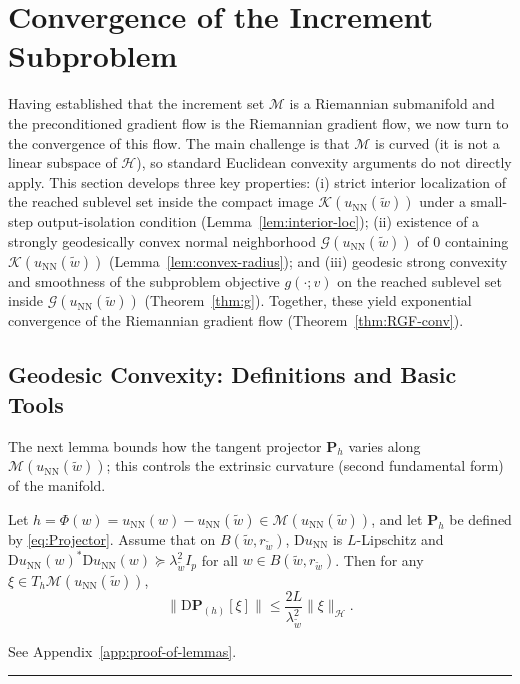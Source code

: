 \documentclass[twoside,11pt]{article}
\newcommand{\BlackBoxProof}{\rule{1.5ex}{1.5ex}}
\renewenvironment{proof}{\par\noindent{\bf Proof\ }}{\hfill\BlackBoxProof\par\medskip}
\newcommand{\rev}[1]{#1}                           %
\renewcommand{\P}{\mathbf{P}}
\newcommand{\D}{\mathrm{D}}
\newcommand{\NN}{\mathrm{NN}}
\newcommand{\calG}{\mathcal{G}}
\newcommand{\calH}{\mathcal{H}}
\newcommand{\calK}{\mathcal{K}}
\newcommand{\calM}{\mathcal{M}}
\begin{document}
\section{Convergence of the Increment Subproblem}\label{sec:conv}
\rev{%
Having established that the increment set $\calM$ is a Riemannian submanifold and the
preconditioned gradient flow is the Riemannian gradient flow, we now turn to the convergence
of this flow. The main challenge is that $\calM$ is curved (it is not a linear subspace of $\calH$),
so standard Euclidean convexity arguments do not directly apply.
This section develops three key properties: (i) strict interior localization of the reached sublevel set inside the compact image $\calK(u_\NN(\tilde w))$ under a small-step output-isolation condition (Lemma~\ref{lem:interior-loc}); (ii) existence of a strongly geodesically convex normal neighborhood $\calG(u_\NN(\tilde w))$ of $0$ containing $\calK(u_\NN(\tilde w))$ (Lemma~\ref{lem:convex-radius}); and (iii) geodesic strong convexity and smoothness of the subproblem
objective $g(\cdot;v)$ on the reached sublevel set inside $\calG(u_\NN(\tilde w))$ (Theorem~\ref{thm:g}).
Together, these yield exponential convergence of the Riemannian gradient flow (Theorem~\ref{thm:RGF-conv}).
}

\subsection{Geodesic Convexity: Definitions and Basic Tools}

The next lemma bounds how the tangent projector $\P_h$ varies along $\calM(u_\NN(\tilde w))$; this controls the extrinsic curvature (second fundamental form) of the manifold.

\begin{lemma}\label{lem:DP_bound}
Let $h=\Phi(w)=u_\NN(w)-u_\NN(\tilde w)\in \mathcal M(u_\NN(\tilde w))$, and let
$\P_h$ be defined by \eqref{eq:Projector}. Assume that on $B(\tilde w,r_{\tilde w})$,
$\D u_\NN$ is $L$-Lipschitz and $\D u_\NN(w)^*\D u_\NN(w)\succeq \lambda_{\tilde w}^2 I_p$
for all $w\in B(\tilde w,r_{\tilde w})$.
Then for any $\xi\in T_h\mathcal M(u_\NN(\tilde w))$,
\[
\|\D \P_{(h)}[\xi]\|
 \le  \frac{2L}{\lambda_{\tilde w}^2} \|\xi\|_{\mathcal H}.
\]
\end{lemma}
\begin{proof}
See Appendix~\ref{app:proof-of-lemmas}.
\end{proof}
\end{document}
